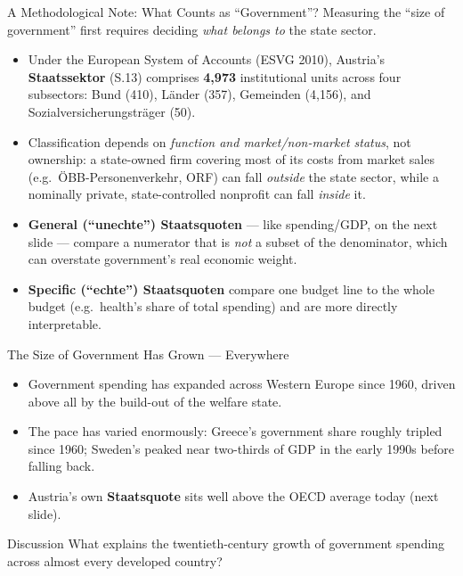 \documentclass[11pt,aspectratio=169]{beamer}
\begin{document}
\begin{frame}{A Methodological Note: What Counts as ``Government''?}
  \footnotesize
  Measuring the ``size of government'' first requires deciding \emph{what belongs to} the state sector.
  \begin{itemize}
    \item Under the European System of Accounts (ESVG 2010), Austria's \textbf{Staatssektor} (S.13) comprises \textbf{4{,}973} institutional units across four subsectors: Bund (410), Länder (357), Gemeinden (4{,}156), and Sozialversicherungsträger (50).
    \item Classification depends on \emph{function and market/non-market status}, not ownership: a state-owned firm covering most of its costs from market sales (e.g.\ ÖBB-Personenverkehr, ORF) can fall \emph{outside} the state sector, while a nominally private, state-controlled nonprofit can fall \emph{inside} it.
    \item \textbf{General (``unechte'') Staatsquoten} --- like spending/GDP, on the next slide --- compare a numerator that is \emph{not} a subset of the denominator, which can overstate government's real economic weight.
    \item \textbf{Specific (``echte'') Staatsquoten} compare one budget line to the whole budget (e.g.\ health's share of total spending) and are more directly interpretable.
  \end{itemize}
 
\end{frame}

\begin{frame}{ The Size of Government Has Grown --- Everywhere}
  \begin{itemize}
    \item Government spending has expanded across Western Europe since 1960, driven above all by the build-out of the welfare state.
    \item The pace has varied enormously: Greece's government share roughly tripled since 1960; Sweden's peaked near two-thirds of GDP in the early 1990s before falling back.
    \item Austria's own \textbf{Staatsquote} sits well above the OECD average today (next slide).
  \end{itemize}
  \begin{block}{Discussion}
    What explains the twentieth-century growth of government spending across almost every developed country?
  \end{block}

\end{frame}
\end{document}
